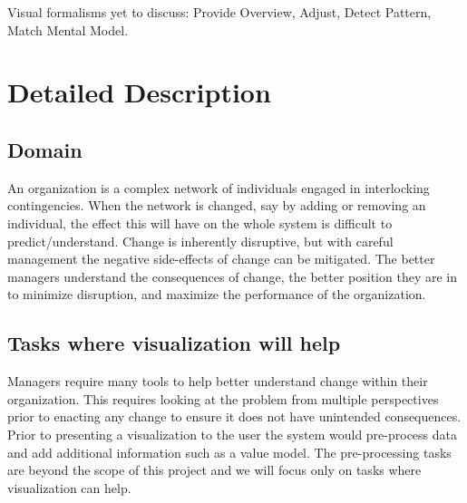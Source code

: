 \documentclass{soups}
\begin{document}
Visual formalisms yet to discuss: Provide Overview, Adjust, Detect Pattern, Match Mental Model\cite{yi2007toward}.

\section{Detailed Description}

\subsection{Domain}

An organization is a complex network of individuals engaged in interlocking contingencies\cite{glenn2006complexity}. When the network is changed, say by adding or removing an individual, the effect this will have on the whole system is difficult to predict/understand. Change is inherently disruptive, but with careful management the negative side-effects of change can be mitigated. The better managers understand the consequences of change, the better position they are in to minimize disruption, and maximize the performance of the organization. 

\subsection{Tasks where visualization will help}

Managers require many tools to help better understand change within their organization.  This requires looking at the problem from multiple perspectives prior to enacting any change to ensure it does not have unintended consequences.  Prior to presenting a visualization to the user the system would pre-process data and add additional information such as a value model.  The pre-processing tasks are beyond the scope of this project and we will focus only on tasks where visualization can help.
\end{document}
